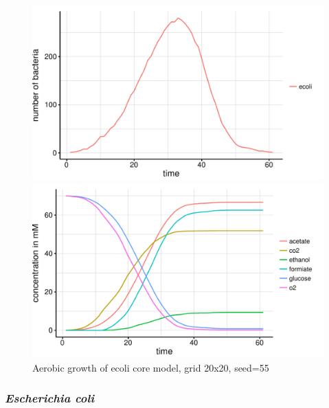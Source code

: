 \begin{figure}[h]
  \centering
  \begin{minipage}[t]{0.45\textwidth}
    \includegraphics[width=\textwidth]{../results/ecoli_20x20_aerob_seed55_growth.pdf}
  \end{minipage}
  \begin{minipage}[t]{0.45\textwidth}
    \includegraphics[width=\textwidth]{../results/ecoli_20x20_aerob_seed55_subs.pdf}
  \end{minipage}
  \caption{Aerobic growth of ecoli core model, grid 20x20, seed=55}
\end{figure}

\subsubsection{\textit{Escherichia coli}}

